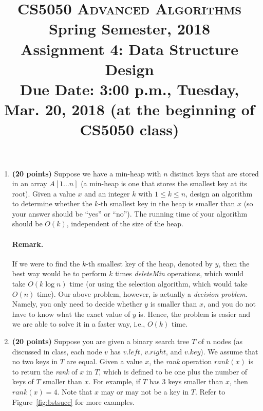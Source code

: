 \documentclass[11pt]{article}
\begin{document}
\baselineskip=14.0pt

\title{CS5050 \textsc{Advanced Algorithms}
\\{\large Spring Semester, 2018}
\\ Assignment 4: Data Structure Design
\\ {\large {\bf Due Date: 3:00 p.m.}, Tuesday, Mar. 20, 2018 ({\bf at the beginning of CS5050 class})}}
\date{}


\maketitle

\vspace{-0.6in}


\begin{enumerate}
\item
{\bf (20 points)}
Suppose we have a min-heap with $n$ distinct keys that are stored in an array $A[1\ldots n]$ (a min-heap is one that stores the smallest key at its root). Given a value $x$ and an integer $k$ with $1\leq k\leq n$, design an algorithm to determine whether the $k$-th smallest key in the heap is smaller than $x$ (so your answer should be ``yes'' or ``no''). The running time of your algorithm should be $O(k)$, independent of the size of the heap.

\vspace{-0.15in}
\paragraph{Remark.} If we were to find the $k$-th smallest key of the heap, denoted by $y$, then the best way would be to perform $k$ times {\em deleteMin} operations, which would take $O(k\log n)$ time (or using the selection algorithm, which would take $O(n)$ time). Our above problem, however, is actually a {\em decision problem}. Namely, you only need to decide whether $y$ is smaller than $x$, and you do not have to know what the exact value of $y$ is. Hence, the problem is easier and we are able to solve it in a faster way, i.e., $O(k)$ time.

\item
{\bf (20 points)}
Suppose you are given a binary search tree $T$ of $n$ nodes (as discussed in class, each node $v$ has $v.left$, $v.right$, and $v.key$). We assume that no two keys in $T$ are equal. Given a value $x$, the {\em rank} operation $rank(x)$ is to return the {\em rank} of $x$ in $T$, which is defined to be one plus the number of keys of $T$ smaller than $x$. For example, if $T$ has 3 keys smaller than $x$, then $rank(x)=4$. Note that $x$ may or may not be a key in $T$. Refer to Figure~\ref{fig:bstsucc} for more examples.



\end{enumerate}
\end{document}
